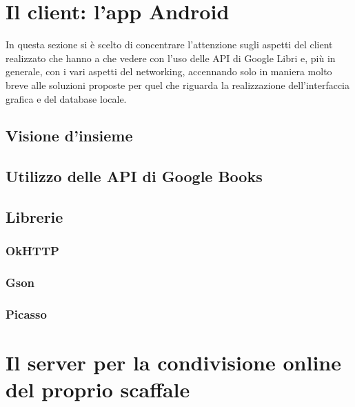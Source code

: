 \documentclass[a4paper]{article}
\begin{document}
\section{Il client: l'app Android}
In questa sezione si è scelto di concentrare l'attenzione sugli aspetti del client realizzato che hanno a che vedere con l'uso delle API di Google Libri e, più in generale, con i vari aspetti del networking, accennando solo in maniera molto breve alle soluzioni proposte per quel che riguarda la realizzazione dell'interfaccia grafica e del database locale.
	\subsection{Visione d'insieme}
	\subsection{Utilizzo delle API di Google Books}
	\subsection{Librerie}
		\subsubsection{OkHTTP}
		\subsubsection{Gson}
		\subsubsection{Picasso}

\newpage
\section{Il server per la condivisione online del proprio scaffale}
\end{document}

